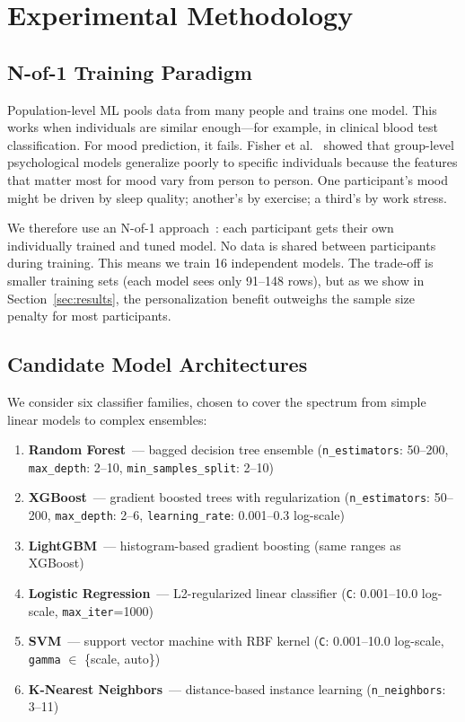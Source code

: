 \documentclass[conference]{IEEEtran}
\begin{document}
\section{Experimental Methodology}
\label{sec:methodology}

\subsection{N-of-1 Training Paradigm}

Population-level ML pools data from many people and trains one model. This works when individuals are similar enough---for example, in clinical blood test classification. For mood prediction, it fails. Fisher et al.~\cite{fisher2018} showed that group-level psychological models generalize poorly to specific individuals because the features that matter most for mood vary from person to person. One participant's mood might be driven by sleep quality; another's by exercise; a third's by work stress.

We therefore use an N-of-1 approach~\cite{molenaar2009}: each participant gets their own individually trained and tuned model. No data is shared between participants during training. This means we train 16 independent models. The trade-off is smaller training sets (each model sees only 91--148 rows), but as we show in Section~\ref{sec:results}, the personalization benefit outweighs the sample size penalty for most participants.

\subsection{Candidate Model Architectures}

We consider six classifier families, chosen to cover the spectrum from simple linear models to complex ensembles:

\begin{enumerate}
    \item \textbf{Random Forest}~--- bagged decision tree ensemble (\texttt{n\_estimators}: 50--200, \texttt{max\_depth}: 2--10, \texttt{min\_samples\_split}: 2--10)
    \item \textbf{XGBoost}~--- gradient boosted trees with regularization (\texttt{n\_estimators}: 50--200, \texttt{max\_depth}: 2--6, \texttt{learning\_rate}: 0.001--0.3 log-scale)
    \item \textbf{LightGBM}~--- histogram-based gradient boosting (same ranges as XGBoost)
    \item \textbf{Logistic Regression}~--- L2-regularized linear classifier (\texttt{C}: 0.001--10.0 log-scale, \texttt{max\_iter}=1000)
    \item \textbf{SVM}~--- support vector machine with RBF kernel (\texttt{C}: 0.001--10.0 log-scale, \texttt{gamma} $\in$ \{scale, auto\})
    \item \textbf{K-Nearest Neighbors}~--- distance-based instance learning (\texttt{n\_neighbors}: 3--11)
\end{enumerate}
\end{document}
